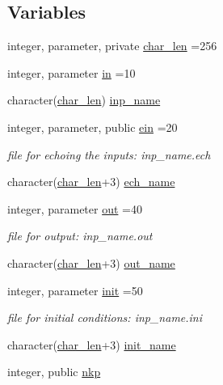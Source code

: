 \subsection*{Variables}
\begin{DoxyCompactItemize}
\item 
integer, parameter, private \hyperlink{namespaceioaero_acd6bdfdcfd986fd1c26261e5996e3b03}{char\+\_\+len} =256
\item 
integer, parameter \hyperlink{namespaceioaero_a09d53f15b1a2c723ad2b4df01c16bccc}{in} =10
\item 
character(\hyperlink{namespaceioaero_acd6bdfdcfd986fd1c26261e5996e3b03}{char\+\_\+len}) \hyperlink{namespaceioaero_ae3b39e5c092106ddc3bb8b81daf8bd13}{inp\+\_\+name}
\item 
integer, parameter, public \hyperlink{namespaceioaero_a6a4b9f5362e2eee64e5777786065f563}{ein} =20
\begin{DoxyCompactList}\small\item\em file for echoing the inputs\+: inp\+\_\+name.\+ech \end{DoxyCompactList}\item 
character(\hyperlink{namespaceioaero_acd6bdfdcfd986fd1c26261e5996e3b03}{char\+\_\+len}+3) \hyperlink{namespaceioaero_a175dde142a22987a0e59b9738444d2e3}{ech\+\_\+name}
\item 
integer, parameter \hyperlink{namespaceioaero_a7c01d4bcd841d8d6281f29d5fc818fd8}{out} =40
\begin{DoxyCompactList}\small\item\em file for output\+: inp\+\_\+name.\+out \end{DoxyCompactList}\item 
character(\hyperlink{namespaceioaero_acd6bdfdcfd986fd1c26261e5996e3b03}{char\+\_\+len}+3) \hyperlink{namespaceioaero_a6693b9440660a84d2d2fc41ac183bb0f}{out\+\_\+name}
\item 
integer, parameter \hyperlink{namespaceioaero_afb3050696f2887599d4083672103b6e7}{init} =50
\begin{DoxyCompactList}\small\item\em file for initial conditions\+: inp\+\_\+name.\+ini \end{DoxyCompactList}\item 
character(\hyperlink{namespaceioaero_acd6bdfdcfd986fd1c26261e5996e3b03}{char\+\_\+len}+3) \hyperlink{namespaceioaero_a5a12b8b21f86b26e7364428778a85d0b}{init\+\_\+name}
\item 
integer, public \hyperlink{namespaceioaero_a24506866304c39bd1fa57ef73b124335}{nkp}

\end{DoxyCompactItemize}
